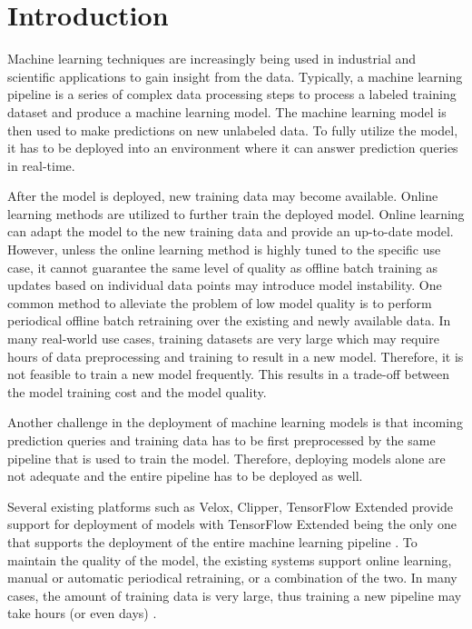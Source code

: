 \section{Introduction} \label{introduction}
Machine learning techniques are increasingly being used in industrial and scientific applications to gain insight from the data.
Typically, a machine learning pipeline is a series of complex data processing steps to process a labeled training dataset and produce a machine learning model.
The machine learning model is then used to make predictions on new unlabeled data.
To fully utilize the model, it has to be deployed into an environment where it can answer prediction queries in real-time.

After the model is deployed, new training data may become available.
Online learning methods are utilized to further train the deployed model.
Online learning can adapt the model to the new training data and provide an up-to-date model.
However, unless the online learning method is highly tuned to the specific use case, it cannot guarantee the same level of quality as offline batch training as updates based on individual data points may introduce model instability\cite{ma2009identifying, macmahan2013}. 
One common method to alleviate the problem of low model quality is to perform periodical offline batch retraining over the existing and newly available data.
In many real-world use cases, training datasets are very large which may require hours of data preprocessing and training to result in a new model.
Therefore, it is not feasible to train a new model frequently.
This results in a trade-off between the model training cost and the model quality.

Another challenge in the deployment of machine learning models is that incoming prediction queries and training data has to be first preprocessed by the same pipeline that is used to train the model.
Therefore, deploying models alone are not adequate and the entire pipeline has to be deployed as well.

Several existing platforms such as Velox, Clipper, TensorFlow Extended provide support for deployment of models with TensorFlow Extended being the only one that supports the deployment of the entire machine learning pipeline \cite{crankshaw2014missing, crankshaw2016clipper, agarwal2014laser, baylor2017tfx}.
To maintain the quality of the model, the existing systems support online learning, manual or automatic periodical retraining, or a combination of the two.
In many cases, the amount of training data is very large, thus training a new pipeline may take hours (or even days) \cite{baylor2017tfx}.

